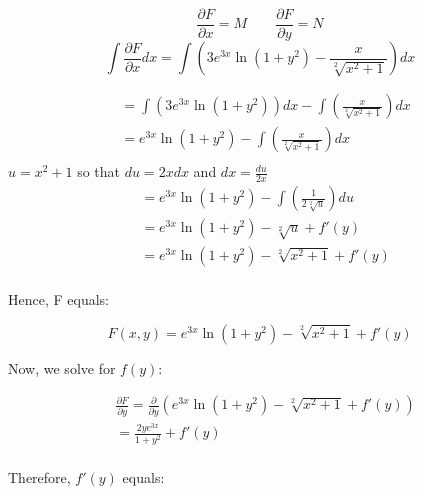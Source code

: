 \documentclass{article}
\begin{document}
    \begin{equation}
        \frac{\partial F}{\partial x} = M 
        \qquad
        \frac{\partial F}{\partial y} = N
    \end{equation} 
    \begin{equation}
            \int \frac{\partial F}{\partial x}dx 
            = 
            \int \left( 3e^{3x}\ln{(1+y^{2})}-\frac{x}{\sqrt[2]{x^{2}+1}} \right)dx
    \end{equation}
    \newpage
    \begin{singlespace}
        \begin{align*}
            &= \int \left(3e^{3x}\ln(1+y^{2})\right)dx  - \int \left(\frac{x}{\sqrt[2]{x^{2}+1}}\right)dx \\
            &= e^{3x}\ln(1+y^{2}) - \int \left(\frac{x}{\sqrt[2]{x^{2}+1}}\right)dx \\
        \end{align*}
        $u=x^{2}+1$ so that $du=2xdx$ and $dx=\frac{du}{2x}$
        \begin{align*}
            &= e^{3x}\ln(1+y^{2}) - \int \left(\frac{1}{2\sqrt[2]{u}}\right)du \\
            &= e^{3x}\ln(1+y^{2}) - \sqrt[2]{u} + f'(y) \\
            &= e^{3x}\ln(1+y^{2}) - \sqrt[2]{x^{2}+1} + f'(y) \\
        \end{align*}
        \begin{flushleft}
            Hence, F equals:
        \end{flushleft}
        \begin{equation}
            F(x, y) = e^{3x}\ln(1+y^{2}) - \sqrt[2]{x^{2}+1} + f'(y)
        \end{equation}
        \begin{flushleft}
            Now, we solve for $f(y)$:
        \end{flushleft}
        \begin{align*}
            &\frac{\partial{F}}{\partial{y}} 
            = \frac{\partial{}}{\partial{y}}\left( e^{3x}\ln(1+y^{2}) - \sqrt[2]{x^{2}+1} + f'(y) \right) \\
            &= \frac{2ye^{3x}}{1+y^{2}} + f'(y) \\
        \end{align*}
        \begin{flushleft}
            Therefore, $f'(y)$ equals:
        \end{flushleft}
        \begin{align*}

\end{align*}
\end{singlespace}
\end{document}
